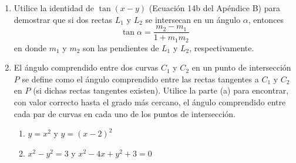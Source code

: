 \item \par
\begin{enumerate}
    \item[(a)] Utilice la identidad de $\tan(x - y)$ (Ecuación 14b del Apéndice B) para demostrar que si dos rectas $L_1$ y $L_2$ se intersecan en un ángulo $\alpha$, entonces
    $$\tan \alpha = \frac{m_2 - m_1}{1 + m_1 m_2}$$
    en donde $m_1$ y $m_2$ son las pendientes de $L_1$ y $L_2$, respectivamente.
    \item[(b)] El ángulo comprendido entre dos curvas $C_1$ y $C_2$ en un punto de intersección $P$ se define como el ángulo comprendido entre las rectas tangentes a $C_1$ y $C_2$ en $P$ (si dichas rectas tangentes existen). Utilice la parte (a) para encontrar, con valor correcto hasta el grado más cercano, el ángulo comprendido entre cada par de curvas en cada uno de los puntos de intersección.
    \begin{enumerate}
        \item[(i)] $y = x^2$ y $y = (x - 2)^2$
        \item[(ii)] $x^2 - y^2 = 3$ y $x^2 - 4x + y^2 + 3 = 0$
    \end{enumerate}
\end{enumerate}
